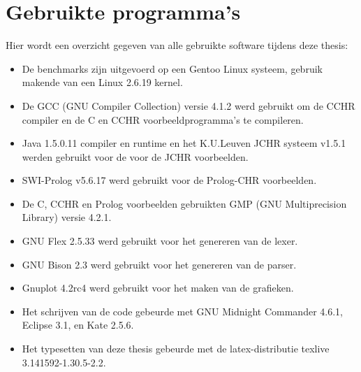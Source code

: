 \chapter{Gebruikte programma's} \label{chap:progs}

Hier wordt een overzicht gegeven van alle gebruikte software tijdens deze thesis: \begin{itemize}
\item De benchmarks zijn uitgevoerd op een Gentoo Linux systeem, gebruik makende van een Linux 2.6.19 kernel.
\item De GCC (GNU Compiler Collection) versie 4.1.2 werd gebruikt om de CCHR compiler en de C en CCHR voorbeeldprogramma's te compileren.
\item Java 1.5.0.11 compiler en runtime en het K.U.Leuven JCHR systeem v1.5.1 werden gebruikt voor de voor de JCHR voorbeelden.
\item SWI-Prolog v5.6.17 werd gebruikt voor de Prolog-CHR voorbeelden.
\item De C, CCHR en Prolog voorbeelden gebruikten GMP (GNU Multiprecision Library) versie 4.2.1.
\item GNU Flex 2.5.33 werd gebruikt voor het genereren van de lexer.
\item GNU Bison 2.3 werd gebruikt voor het genereren van de parser.
\item Gnuplot 4.2rc4 werd gebruikt voor het maken van de grafieken.
\item Het schrijven van de code gebeurde met GNU Midnight Commander 4.6.1, Eclipse 3.1, en Kate 2.5.6.
\item Het typesetten van deze thesis gebeurde met de latex-distributie texlive 3.141592-1.30.5-2.2.
\end{itemize}

